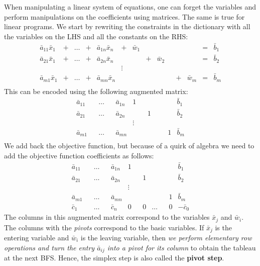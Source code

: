 \documentclass[
]{book}
\theoremstyle{definition}
\theoremstyle{definition}
\theoremstyle{definition}
\theoremstyle{definition}
\theoremstyle{remark}
\begin{document}
When manipulating a linear system of equations, one can forget the variables and perform manipulations on the coefficients using matrices.
The same is true for linear programs.
We start by rewriting the constraints in the dictionary with all the variables on the LHS and all the constants on the RHS:
\begin{equation}
  \begin{array}{rrrrrrrrrrrrrr}
      \bar{a}_{11} \bar{x}_1 & + & \dots & + & \bar{a}_{1n} \bar{x}_n & + & \bar{w}_1 & & & & & & = &  \bar{b}_1\\
      \bar{a}_{21} \bar{x}_1 & + & \dots & + & \bar{a}_{2n} \bar{x}_n & & & + & \bar{w}_2 & & & & = &  \bar{b}_2\\
      & & & & & \vdots &  \\
      \bar{a}_{m1} \bar{x}_1 & + & \dots & + & \bar{a}_{mn} \bar{x}_n & & & & & & + & \bar{w}_m & = & \bar{b}_m\\
  \end{array} 
  \label{eq:standard-tableau}
\end{equation}
This can be encoded using the following augmented matrix:
\begin{equation*}
  \begin{array}{rrrrrrrrrrr|r}
      \bar{a}_{11}  & & \dots & & \bar{a}_{1n}  & 1 & & & & & &\bar{b}_1\\
      \bar{a}_{21}  & & \dots & & \bar{a}_{2n}  & & & 1 & & & &\bar{b}_2\\
      & & & & & \vdots &  \\
      \bar{a}_{m1}  & & \dots & & \bar{a}_{mn}  & & & & & & 1 &\bar{b}_m\\
  \end{array}
\end{equation*}
We add back the objective function, but because of a quirk of algebra we need to add the objective function coefficients as follows:
\begin{equation*}
 \begin{array}{rrrrrrrrrrr|r}
      \bar{a}_{11}  & & \dots & & \bar{a}_{1n}  & 1 & & & & & &\bar{b}_1\\
      \bar{a}_{21}  & & \dots & & \bar{a}_{2n}  & & & 1 & & & &\bar{b}_2\\
      & & & & & \vdots &  \\
      \bar{a}_{m1}  & & \dots & & \bar{a}_{mn}  & & & & & & 1 &\bar{b}_m\\ \hline
      \bar{c}_1  & & \dots & & \bar{c}_{n}  & 0 & & 0 & \dots & & 0 &-\bar{c}_0
  \end{array} 
\end{equation*}
The columns in this augmented matrix correspond to the variables \(\bar{x}_j\) and \(\bar{w}_i\). The columns with the \emph{pivots} correspond to the basic variables.
If \(\bar{x}_j\) is the entering variable and \(\bar{w}_i\) is the leaving variable, then \emph{we perform elementary row operations and turn the entry \(\bar{a}_{ij}\) into a pivot for its column} to obtain the tableau at the next BFS. Hence, the simplex step is also called the \textbf{pivot step}.
\end{document}
